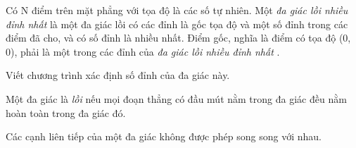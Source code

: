 Có N điểm trên mặt phẳng với tọa độ là các số tự nhiên. Một   \textit{    đa giác lồi nhiều đỉnh nhất   }   là một đa giác lồi có các đỉnh là       gốc tọa độ      và một số đỉnh trong các điểm đã cho, và có số đỉnh là nhiều nhất. Điểm gốc, nghĩa là điểm có tọa độ (0, 0),       phải      là một trong các đỉnh của   \textit{    đa giác lồi nhiều đỉnh nhất   }   .  

   Viết chương trình xác định số đỉnh của đa giác này.  

   Một đa giác là   \textit{    lồi   }   nếu mọi đoạn thẳng có đầu mút nằm trong đa giác đều nằm hoàn toàn trong đa giác đó.  

   Các cạnh liên tiếp của một đa giác không được phép song song với nhau.  

\